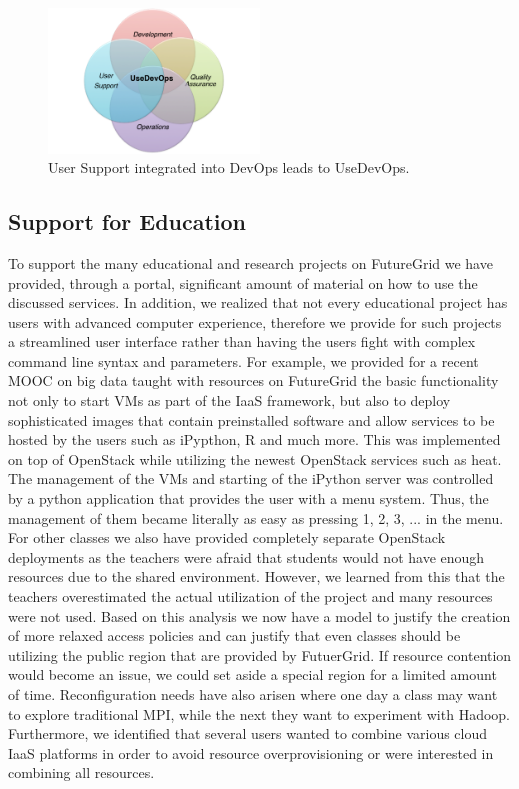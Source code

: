 \documentclass{article}
\begin{document}
\begin{figure}[htb]
  \centering
    \includegraphics[width=0.5\textwidth]{images/usedevops.pdf}
  \caption{User Support integrated into DevOps leads to UseDevOps.}
  \label{F:usedevops}
\end{figure}




\subsection{Support for Education}


To support the many educational and research projects on FutureGrid we have provided, through a portal, significant amount of material on how to use the discussed services. In addition, we realized that not every educational project has users with advanced computer experience, therefore we provide for such projects a streamlined user interface rather than having the users fight with complex command line syntax and parameters. For example, we provided for a recent MOOC on big data taught with resources on FutureGrid the basic functionality not only to start VMs as part of the IaaS framework, but also to deploy sophisticated images that contain preinstalled software and allow services to be hosted by the users such as iPypthon, R and much more. This was implemented on top of OpenStack while utilizing the newest OpenStack services such as heat. The management of the VMs and starting of the iPython server was controlled by a python application that provides the user with a menu system. Thus, the management of them became literally as easy as pressing 1, 2, 3, ... in the menu. For other classes we also have provided completely separate OpenStack deployments as the teachers were afraid that students would not have enough resources due to the shared environment. However, we learned from this that the teachers overestimated the actual utilization of the project and many resources were not used. Based on this analysis we now have a model to justify the creation of more relaxed access policies and can justify that even classes should be utilizing the public region that are provided by FutuerGrid. If resource contention would become an issue, we could set aside a special region for a limited amount of time. Reconfiguration needs have also arisen where one day a class may want to explore traditional MPI, while the next they want to experiment with Hadoop. Furthermore, we identified that several users wanted to combine various cloud IaaS platforms in order to avoid resource overprovisioning or were interested in combining all resources. 
\end{document}
